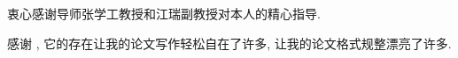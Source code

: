 
\begin{ack}
  衷心感谢导师张学工教授和江瑞副教授对本人的精心指导. 

  感谢 \thuthesis, 它的存在让我的论文写作轻松自在了许多, 让我的论文格式规整漂亮了许多. 
\end{ack}
